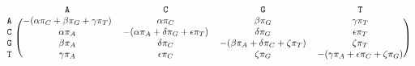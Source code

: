 \documentclass{standalone}
\begin{document}
$
\begin{blockarray}{cccccc}
& \texttt{A} & \texttt{C} & \texttt{G} & \texttt{T} \\
\begin{block}{c(ccccc)}
\texttt{A} & -(\alpha \pi_C + \beta \pi_G + \gamma \pi_T) & \alpha   \pi_C                                  & \beta  \pi_G                                & \gamma   \pi_T \\
\texttt{C} & \alpha \pi_A                                 & -(\alpha \pi_A + \delta \pi_G + \epsilon \pi_T) & \delta \pi_G                                & \epsilon \pi_T \\
\texttt{G} & \beta  \pi_A                                 & \delta   \pi_C                                  & -(\beta \pi_A + \delta \pi_C + \zeta \pi_T) & \zeta    \pi_T \\
\texttt{T} & \gamma \pi_A                                 & \epsilon \pi_C                                  & \zeta  \pi_G                                & -(\gamma \pi_A + \epsilon \pi_C + \zeta \pi_G) \\
\end{block}
\end{blockarray}
$
\end{document}
